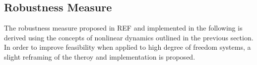 




     
     

    

    

\subsection{Robustness Measure} \label{robustnessmeasure}

    The robustness measure proposed in REF and implemented in the following is derived using the concepts of nonlinear dynamics outlined in the previous section. In order to improve feasibility when applied to high degree of freedom systems, a slight reframing of the theroy and implementation is proposed.
    
